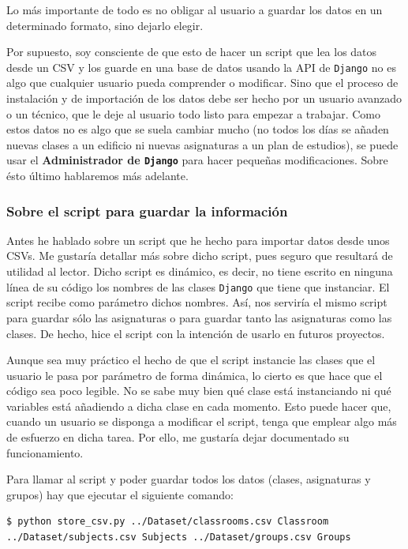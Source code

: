 Lo más importante de todo es no obligar al usuario a guardar los datos en un determinado formato, sino dejarlo elegir. 

Por supuesto, soy consciente de que esto de hacer un script que lea los datos desde un CSV y los guarde en una base de datos usando la API de \texttt{Django} no es algo que cualquier usuario pueda comprender o modificar. Sino que el proceso de instalación y de importación de los datos debe ser hecho por un usuario avanzado o un técnico, que le deje al usuario todo listo para empezar a trabajar. Como estos datos no es algo que se suela cambiar mucho (no todos los días se añaden nuevas clases a un edificio ni nuevas asignaturas a un plan de estudios), se puede usar el \textbf{Administrador de \texttt{Django}} para hacer pequeñas modificaciones. Sobre ésto último hablaremos más adelante.

\subsubsection{Sobre el script para guardar la información}
Antes he hablado sobre un script que he hecho para importar datos desde unos CSVs. Me gustaría detallar más sobre dicho script, pues seguro que resultará de utilidad al lector. Dicho script es dinámico, es decir, no tiene escrito en ninguna línea de su código los nombres de las clases \texttt{Django} que tiene que instanciar. El script recibe como parámetro dichos nombres. Así, nos serviría el mismo script para guardar sólo las asignaturas o para guardar tanto las asignaturas como las clases. De hecho, hice el script con la intención de usarlo en futuros proyectos.

Aunque sea muy práctico el hecho de que el script instancie las clases que el usuario le pasa por parámetro de forma dinámica, lo cierto es que hace que el código sea poco legible. No se sabe muy bien qué clase está instanciando ni qué variables está añadiendo a dicha clase en cada momento. Esto puede hacer que, cuando un usuario se disponga a modificar el script, tenga que emplear algo más de esfuerzo en dicha tarea. Por ello, me gustaría dejar documentado su funcionamiento.

Para llamar al script y poder guardar todos los datos (clases, asignaturas y grupos) hay que ejecutar el siguiente comando:

\begin{verbatim}
$ python store_csv.py ../Dataset/classrooms.csv Classroom ../Dataset/subjects.csv Subjects ../Dataset/groups.csv Groups
\end{verbatim}

